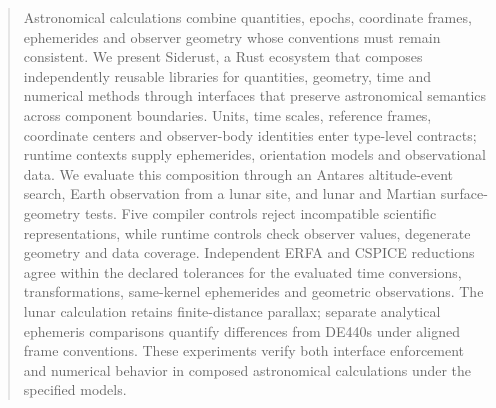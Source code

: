 \begin{abstract}

    Astronomical calculations combine quantities, epochs, coordinate frames, ephemerides and observer
    geometry whose conventions must remain consistent. We present Siderust, a Rust ecosystem that
    composes independently reusable libraries for quantities, geometry, time and numerical methods
    through interfaces that preserve astronomical semantics across component boundaries. Units, time
    scales, reference frames, coordinate centers and observer-body identities enter type-level
    contracts; runtime contexts supply ephemerides, orientation models and observational data. We
    evaluate this composition through an Antares altitude-event search, Earth observation from a lunar
    site, and lunar and Martian surface-geometry tests. Five compiler controls reject incompatible
    scientific representations, while runtime controls check observer values, degenerate geometry and
    data coverage. Independent ERFA and CSPICE reductions agree within the declared tolerances for the
    evaluated time conversions, transformations, same-kernel ephemerides and geometric observations.
    The lunar calculation retains finite-distance parallax; separate analytical ephemeris comparisons
    quantify differences from DE440s under aligned frame conventions. These experiments verify both
    interface enforcement and numerical behavior in composed astronomical calculations under the
    specified models.
\end{abstract}
